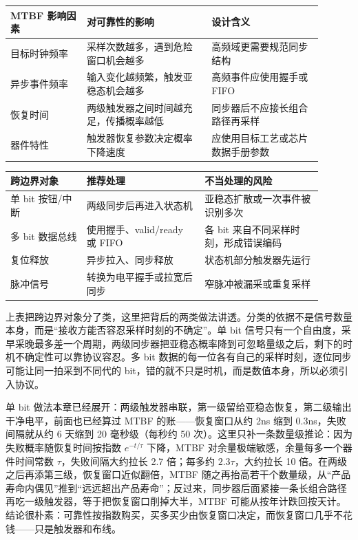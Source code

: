 \begin{longtable}{L{0.22\linewidth}L{0.36\linewidth}L{0.32\linewidth}}
\toprule
MTBF 影响因素 & 对可靠性的影响 & 设计含义 \\
\midrule
目标时钟频率 & 采样次数越多，遇到危险窗口机会越多 & 高频域更需要规范同步结构 \\
异步事件频率 & 输入变化越频繁，触发亚稳态机会越多 & 高频事件应使用握手或 FIFO \\
恢复时间 & 两级触发器之间时间越充足，传播概率越低 & 同步器后不应接长组合路径再采样 \\
器件特性 & 触发器恢复参数决定概率下降速度 & 应使用目标工艺或芯片数据手册参数 \\
\bottomrule
\end{longtable}
\vspace{0.8em plus 0.25em}

\begin{longtable}{L{0.22\linewidth}L{0.34\linewidth}L{0.34\linewidth}}
\toprule
跨边界对象 & 推荐处理 & 不当处理的风险 \\
\midrule
单 bit 按钮/中断 & 两级同步后再进入状态机 & 亚稳态扩散或一次事件被识别多次 \\
多 bit 数据总线 & 使用握手、valid/ready 或 FIFO & 各 bit 来自不同采样时刻，形成错误编码 \\
复位释放 & 异步拉入、同步释放 & 状态机部分触发器先运行 \\
脉冲信号 & 转换为电平握手或拉宽后同步 & 窄脉冲被漏采或重复采样 \\
\bottomrule
\end{longtable}
\vspace{0.8em plus 0.25em}


上表把跨边界对象分了类，这里把背后的两类做法讲透。分类的依据不是信号数量本身，而是“接收方能否容忍采样时刻的不确定”。单 bit 信号只有一个自由度，采早采晚最多差一个周期，两级同步器把亚稳态概率降到可忽略量级之后，剩下的时机不确定性可以靠协议容忍。多 bit 数据的每一位各有自己的采样时刻，逐位同步可能让同一拍采到不同代的 bit，错的就不只是时机，而是数值本身，所以必须引入协议。

单 bit 做法本章已经展开：两级触发器串联，第一级留给亚稳态恢复，第二级输出干净电平，前面也已经算过 MTBF 的账——恢复窗口从约 2ns 缩到 0.3ns，失败间隔就从约 6 天缩到 20 毫秒级（每秒约 50 次）。这里只补一条数量级推论：因为失败概率随恢复时间按指数 $e^{-t/\tau}$ 下降，MTBF 对余量极端敏感，余量每多一个器件时间常数 $\tau$，失败间隔大约拉长 2.7 倍；每多约 $2.3\tau$，大约拉长 10 倍。在两级之后再添第三级，恢复窗口近似翻倍，MTBF 随之再抬高若干个数量级，从“产品寿命内偶见”推到“远远超出产品寿命”；反过来，同步器后面紧接一条长组合路径再吃一级触发器，等于把恢复窗口削掉大半，MTBF 可能从按年计跌回按天计。结论很朴素：可靠性按指数购买，买多买少由恢复窗口决定，而恢复窗口几乎不花钱——只是触发器和布线。

